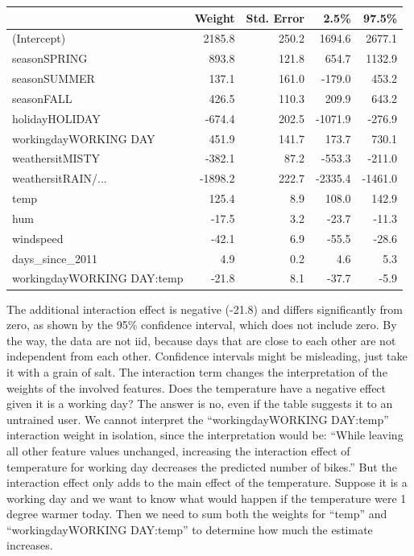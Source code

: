 \documentclass[
  11pt,
]{scrbook}
\begin{document}
\begin{table}
\centering
\begin{tabular}{>{\raggedright\arraybackslash}p{4.1cm}rrrr}
\toprule
  & Weight & Std. Error & 2.5\% & 97.5\%\\
\midrule
(Intercept) & 2185.8 & 250.2 & 1694.6 & 2677.1\\
seasonSPRING & 893.8 & 121.8 & 654.7 & 1132.9\\
seasonSUMMER & 137.1 & 161.0 & -179.0 & 453.2\\
seasonFALL & 426.5 & 110.3 & 209.9 & 643.2\\
holidayHOLIDAY & -674.4 & 202.5 & -1071.9 & -276.9\\
\addlinespace
workingdayWORKING DAY & 451.9 & 141.7 & 173.7 & 730.1\\
weathersitMISTY & -382.1 & 87.2 & -553.3 & -211.0\\
weathersitRAIN/... & -1898.2 & 222.7 & -2335.4 & -1461.0\\
temp & 125.4 & 8.9 & 108.0 & 142.9\\
hum & -17.5 & 3.2 & -23.7 & -11.3\\
\addlinespace
windspeed & -42.1 & 6.9 & -55.5 & -28.6\\
days\_since\_2011 & 4.9 & 0.2 & 4.6 & 5.3\\
workingdayWORKING DAY:temp & -21.8 & 8.1 & -37.7 & -5.9\\
\bottomrule
\end{tabular}
\end{table}

The additional interaction effect is negative (-21.8) and differs significantly from zero, as shown by the 95\% confidence interval, which does not include zero.
By the way, the data are not iid, because days that are close to each other are not independent from each other.
Confidence intervals might be misleading, just take it with a grain of salt.
The interaction term changes the interpretation of the weights of the involved features.
Does the temperature have a negative effect given it is a working day?
The answer is no, even if the table suggests it to an untrained user.
We cannot interpret the ``workingdayWORKING DAY:temp'' interaction weight in isolation, since the interpretation would be:
``While leaving all other feature values unchanged, increasing the interaction effect of temperature for working day decreases the predicted number of bikes.''
But the interaction effect only adds to the main effect of the temperature.
Suppose it is a working day and we want to know what would happen if the temperature were 1 degree warmer today.
Then we need to sum both the weights for ``temp'' and ``workingdayWORKING DAY:temp'' to determine how much the estimate increases.
\end{document}
